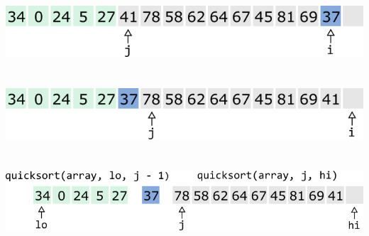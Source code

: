 \documentclass{article}
\begin{document}
\begin{multicols}{2}
\\
\\
\\
\includegraphics[scale=0.53]{../images/qs9.png}
\\
\\
\\
\includegraphics[scale=0.53]{../images/qs10.png}
\\
\\
\\
\includegraphics[scale=0.47]{../images/qs11.png}
\end{multicols}
\end{document}
